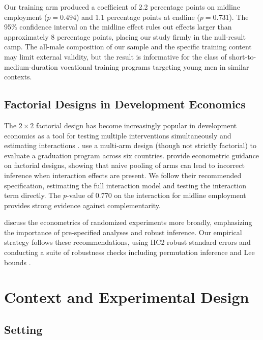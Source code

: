 \documentclass[12pt]{article}
\begin{document}
Our training arm produced a coefficient of 2.2 percentage points on midline employment ($p = 0.494$) and 1.1 percentage points at endline ($p = 0.731$). The 95\% confidence interval on the midline effect rules out effects larger than approximately 8 percentage points, placing our study firmly in the null-result camp. The all-male composition of our sample and the specific training content may limit external validity, but the result is informative for the class of short-to-medium-duration vocational training programs targeting young men in similar contexts.

\subsection{Factorial Designs in Development Economics}

The $2 \times 2$ factorial design has become increasingly popular in development economics as a tool for testing multiple interventions simultaneously and estimating interactions \citep{muralidharan2023factorial}. \citet{banerjee2015multifaceted} use a multi-arm design (though not strictly factorial) to evaluate a graduation program across six countries. \citet{muralidharan2023factorial} provide econometric guidance on factorial designs, showing that naive pooling of arms can lead to incorrect inference when interaction effects are present. We follow their recommended specification, estimating the full interaction model and testing the interaction term directly. The $p$-value of 0.770 on the interaction for midline employment provides strong evidence against complementarity.

\citet{athey2017econometrics} discuss the econometrics of randomized experiments more broadly, emphasizing the importance of pre-specified analyses and robust inference. Our empirical strategy follows these recommendations, using HC2 robust standard errors and conducting a suite of robustness checks including permutation inference \citep{young2019channeling} and Lee bounds \citep{lee2009training}.


\section{Context and Experimental Design}\label{sec:context}

\subsection{Setting}
\end{document}
